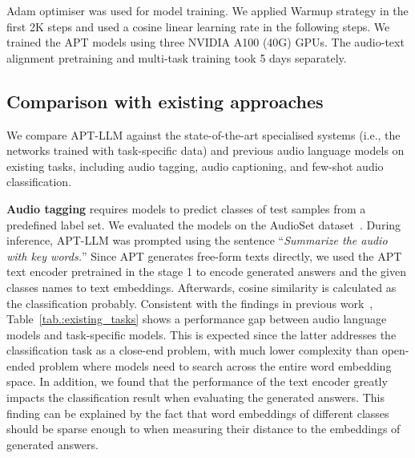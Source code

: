 Adam optimiser was used for model training. We applied Warmup strategy in the first 2K steps and used a cosine linear learning rate in the following steps. We trained the APT models using three NVIDIA A100 (40G) GPUs. The audio-text alignment pretraining and multi-task training took 5 days separately.

\subsection{Comparison with existing approaches} \label{subsec:comparison_with_existing_approaches}
We compare APT-LLM against the state-of-the-art specialised systems (i.e., the networks trained with task-specific data) and previous audio language models on existing tasks, including audio tagging, audio captioning, and few-shot audio classification.

\textbf{Audio tagging} requires models to predict classes of test samples from a predefined label set. We evaluated the models on the AudioSet dataset~\citep{gemmeke_audio_2017}. During inference, APT-LLM was prompted using the sentence ``\textit{Summarize the audio with key words.}'' Since APT generates free-form texts directly, we used the APT text encoder pretrained in the stage 1 to encode generated answers and the given classes names to text embeddings. Afterwards, cosine similarity is calculated as the classification probably.
Consistent with the findings in previous work~\citep{gong_listen_2023}, Table~\ref{tab.:existing_tasks} shows a performance gap between audio language models and task-specific models. This is expected since the latter addresses the classification task as a close-end problem, with much lower complexity than open-ended problem where models need to search across the entire word embedding space. In addition, we found that the performance of the text encoder greatly impacts the classification result when evaluating the generated answers. This finding can be explained by the fact that  word embeddings of different classes should be sparse enough to when measuring their distance to the embeddings of generated answers.

